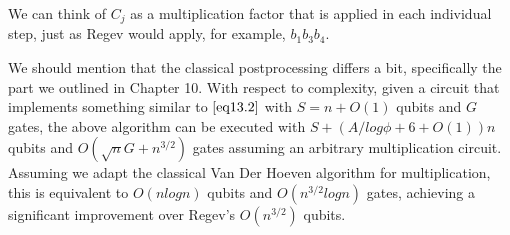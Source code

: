 We can think of $C_j$ as a multiplication factor that is applied in each individual step, just as Regev would apply, for example, $b_1b_3b_4$.

We should mention that the classical postprocessing differs a bit, specifically the part we outlined in Chapter 10. With respect to complexity, given a circuit that implements something similar to $\eqref{eq13.2}$ with $S = n+ O(1)$ qubits and $G$ gates, the above algorithm can be executed with $S + (A/log\phi + 6 + O(1))n$ qubits and $O(\sqrt{n}G + n^{3/2})$ gates assuming an arbitrary multiplication circuit. Assuming we adapt the classical Van Der Hoeven algorithm for multiplication\cite{HarveyVanDerHoeven2021}, this is equivalent to $O(nlogn)$ qubits and $O(n^{3/2} logn)$ gates, achieving a significant improvement over Regev's $O(n^{3/2})$ qubits.







